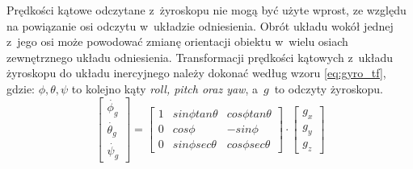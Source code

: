 Prędkości kątowe odczytane z~żyroskopu nie mogą być użyte wprost, ze względu
na powiązanie osi odczytu w~układzie odniesienia.
Obrót układu wokół jednej z~jego osi może powodować zmianę orientacji obiektu
w~wielu osiach zewnętrznego układu odniesienia.
Transformacji prędkości kątowych z~układu żyroskopu do układu inercyjnego
należy dokonać według wzoru \ref{eq:gyro_tf}, gdzie: $ \phi, \theta, \psi $ to
kolejno kąty \textit{roll, pitch oraz yaw}, a~$ g $~to odczyty żyroskopu.
\begin{equation}
	\begin{bmatrix}
		\dot{\phi_g} \\
		\dot{\theta_g} \\
		\dot{\psi_g}
	\end{bmatrix}
	=
	\begin{bmatrix}
		1 & sin\phi tan\theta & cos\phi tan\theta \\
		0 & cos\phi           & -sin\phi \\
		0 & sin\phi sec\theta & cos\phi sec\theta
	\end{bmatrix}
	\cdot
	\begin{bmatrix}
		g_x \\
		g_y \\
		g_z
	\end{bmatrix}
\label{eq:gyro_tf}
\end{equation}

